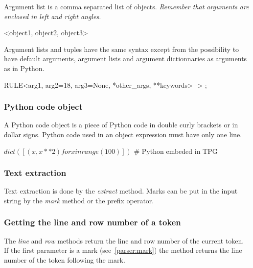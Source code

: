 Argument list is a comma separated list of objects.
\emph{Remember that arguments are enclosed in left and right angles.}

\begin{verbatimtab}[4]
    <object1, object2, object3>
\end{verbatimtab}

Argument lists and tuples have the same syntax except from the possibility to have
default arguments, argument lists and argument dictionnaries as arguments as in Python.

\begin{verbatimtab}[4]
    RULE<arg1, arg2=18, arg3=None, *other_args, **keywords> -> ;
\end{verbatimtab}

\subsubsection{Python code object}

A Python code object is a piece of Python code in double curly brackets or in dollar signs.
Python code used in an object expression must have only one line.

\begin{verbatimtab}[4]
    $ dict([ (x,x**2) for x in range(100) ]) $ # Python embeded in TPG
\end{verbatimtab}

\subsubsection{Text extraction}

Text extraction is done by the \emph{extract} method.
Marks can be put in the input string by the \emph{mark} method or the prefix \emph{\@} operator.


\subsubsection{Getting the line and row number of a token}

The \emph{line} and \emph{row} methods return the line and row number of the current token.
If the first parameter is a mark (see~\ref{parser:mark}) the method returns the line number of the token following the mark.

